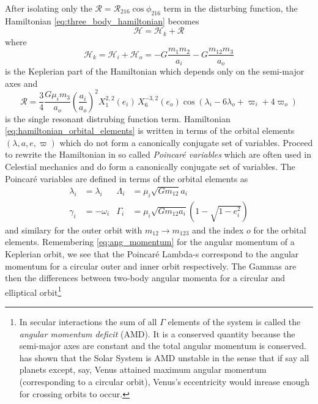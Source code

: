 \documentclass[ twoside,openright,titlepage,numbers=noenddot,headinclude,%
                footinclude=true,cleardoublepage=empty,abstractoff, %
                BCOR=5mm,paper=a4,fontsize=11pt,%
                american,%
                ]{scrreprt}
\begin{document}
After isolating only the $\mathcal{R}=\mathcal{R}_{216}
\cos\phi_{216}$ term in the disturbing function, the Hamiltonian
\ref{eq:three_body_hamiltonian} becomes
\begin{equation}
    \mathcal{H}=\mathcal{H}_k+\mathcal{R}
    \label{eq:hamiltonian_orbital_elements}
\end{equation}
where
\begin{equation}
    \mathcal{H}_k=\mathcal{H}_i+\mathcal{H}_o=
    -G \frac{m_1m_2}{a_i} -G \frac{m_{12}m_3}{a_o}
\end{equation}
is the Keplerian part of the Hamiltonian which depends only on the 
semi-major axes and
\begin{equation}
    \mathcal{R}=\frac{3}{4}\frac{G\mu_im_3}{a_o}\left(\frac{a_i}{a_o}\right)^2
    X^{2,2}_1(e_i)\,X^{-3,2}_6(e_o)\cos(\lambda_i-6\lambda_o+
    \varpi_i + 4\varpi_o)
\end{equation}
is the single resonant distrubing function term. Hamiltonian 
\ref{eq:hamiltonian_orbital_elements} is written in terms of the
orbital elements $(\lambda,a,e,\varpi)$ which do not form a canonically
conjugate set of variables. Proceed to rewrite the Hamiltonian in
so called \emph{Poincaré variables} which are often used in Celestial 
mechanics and do form a canonically conjugate set of variables. The Poincaré
variables are defined in terms of the orbital elements as
\begin{equation}
    \begin{aligned}
        \lambda_i&=\lambda_i &\Lambda_i&=\mu_i\sqrt{Gm_{12}}a_i\\
        \gamma_i&=-\omega_i & \Gamma_i&=\mu_i\sqrt{Gm_{12}a_i}
    \left(1-\sqrt{1-e_i^2}\right)
\end{aligned}
\label{eq:poincare_variables}
\end{equation}
and similary for the outer orbit with $m_{12}\rightarrow m_{123}$ and the
index $o$ for the orbital elements. Remembering \cref{eq:ang_momentum} for 
the angular momentum of a Keplerian orbit, we see that the Poincaré 
Lambda-s correspond to the angular momentum for a circular outer and inner orbit
respectively. The Gammas are then the differences between two-body angular
momenta for a circular and elliptical orbit\footnote{In secular interactions
the sum of all $\Gamma$ elements of the system
is called the \emph{angular momentum deficit} (AMD). It is a conserved quantity
because the semi-major axes are constant and the total angular momentum is conserved.
\cite{laskar} has shown that the Solar System is AMD unstable in the sense that
if say all planets except, say, Venus attained maximum angular momentum (corresponding
to a circular orbit), Venus's eccentricity would inrease enough for crossing
orbits to occur.}
\end{document}
